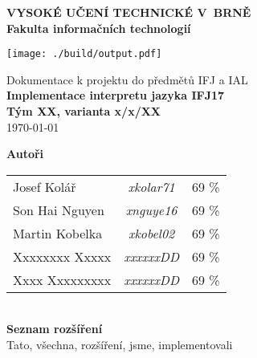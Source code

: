 \begin{titlepage}
	\centering

	{\fontsize{20pt}{15pt}\bfseries 
		VYSOKÉ UČENÍ TECHNICKÉ V~BRNĚ\\
		\vspace{8pt}
		Fakulta informačních technologií
	}

	\vspace*{64pt}

	\texttt{[image: ./build/output.pdf]}
	\vspace*{22pt}

	{\Large Dokumentace k projektu do předmětů IFJ a IAL\\}
	\vspace*{4pt}
	{\LARGE \bfseries Implementace interpretu jazyka IFJ17\\}
	\vspace*{62pt}
	{\Large \bfseries Tým XX, varianta x/x/XX\\}
	\vspace*{42pt}
	{\Large \today}

	\vspace*{64pt}
	{\Large \bfseries Autoři\\}
	\vspace*{8pt}
	\begin{tabular}{ l c r }
	  Josef Kolář & \textit{xkolar71} & 69 \% \\
	  Son Hai Nguyen & \textit{xnguye16} & 69 \% \\
	  Martin Kobelka & \textit{xkobel02} & 69 \% \\
	  Xxxxxxxx Xxxxx & \textit{xxxxxxDD} & 69 \% \\
	  Xxxx Xxxxxxxxx & \textit{xxxxxxDD} & 69 \% \\
	\end{tabular}\\
	\vspace*{32pt}
	{\Large \bfseries Seznam rozšíření\\}
	\vspace*{8pt}
	Tato, všechna, rozšíření, jsme, implementovali\\
	\vspace*{64pt}

\end{titlepage}